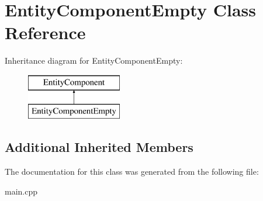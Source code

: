 \hypertarget{class_entity_component_empty}{}\section{Entity\+Component\+Empty Class Reference}
\label{class_entity_component_empty}
Inheritance diagram for Entity\+Component\+Empty\+:\begin{figure}[H]
\begin{center}
\leavevmode
\includegraphics[height=2.000000cm]{class_entity_component_empty}
\end{center}
\end{figure}
\subsection*{Additional Inherited Members}


The documentation for this class was generated from the following file\+:\begin{DoxyCompactItemize}
\item 
main.\+cpp\end{DoxyCompactItemize}
